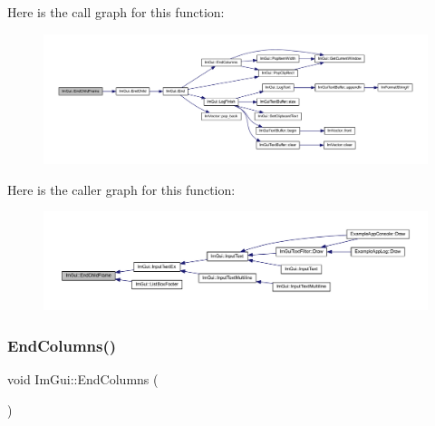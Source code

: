 Here is the call graph for this function\+:
\nopagebreak
\begin{figure}[H]
\begin{center}
\leavevmode
\includegraphics[width=350pt]{namespace_im_gui_ac4bd9024554b5074805bc0ce3076c514_cgraph}
\end{center}
\end{figure}
Here is the caller graph for this function\+:
\nopagebreak
\begin{figure}[H]
\begin{center}
\leavevmode
\includegraphics[width=350pt]{namespace_im_gui_ac4bd9024554b5074805bc0ce3076c514_icgraph}
\end{center}
\end{figure}
\mbox{\label{namespace_im_gui_af93bed3bce5475fe4d525d744f16aa20}} 
\subsubsection{\texorpdfstring{End\+Columns()}{EndColumns()}}
{\footnotesize\ttfamily void Im\+Gui\+::\+End\+Columns (\begin{DoxyParamCaption}{ }\end{DoxyParamCaption})}

